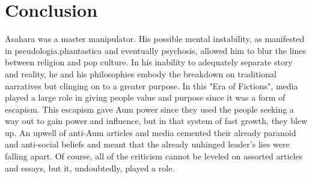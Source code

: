 \documentclass[12pt, letterpaper]{article}
\newcommand{\poses}[1]{#1's}
\begin{document}
\section{Conclusion}
Asahara was a master manipulator. His possible mental instability, as manifested in pseudologia.phantastica
and eventually psychosis, allowed him to blur the lines between religion and pop culture. In his inability to
adequately separate story and reality, he and his philosophies embody the breakdown on traditional narratives
but clinging on to a greater purpose. In this "Era of Fictions", media played a large role in giving people
value and purpose since it was a form of escapism. This escapism gave Aum power since they used the people
seeking a way out to gain power and influence, but in that system of fast growth, they blew up. An upwell of
anti-Aum articles and media cemented their already paranoid and anti-social beliefs and meant that the
already unhinged \poses{leader} lies were falling apart. Of course, all of the criticism cannot be leveled on
assorted articles and essays, but it, undoubtedly, played a role. 
\end{document}
